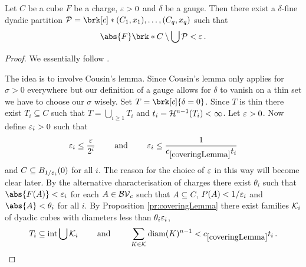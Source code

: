 \begin{lemma}\label{le:DisjointCube}
Let $C$ be a cube $F$ be a charge, $\varepsilon>0$ and $\delta$ be a gauge. Then there exist a $\delta$-fine dyadic partition $\cP=\brk[c]*{(C_1,x_1),\dots,(C_q,x_q)}$ such that
\begin{align*}
	\abs{F}\brk*{C\setminus\bigcup\cP}<\e\,.
\end{align*}
\end{lemma}
\begin{proof}

We essentially follow \cite[Lemma 2.6.4]{Pfe2001}.

The idea is to involve Cousin's lemma. Since Cousin's lemma only applies for $\sigma>0$ everywhere but our definition of a gauge allows for $\delta$ to vanish on a thin set we have to choose our $\sigma$ wisely.
Set $T=\brk[c]{\delta=0}$. Since $T$ is thin there exist $T_i\subseteq C$ such that $T=\bigcup_{i\geq1}T_i$ and $t_i=\mathcal{H}^{n-1}(T_i)<\infty$.
Let $\varepsilon>0$. 
Now define $\varepsilon_i>0$ such that
\begin{align*}
	\e_i\leq \frac{\e}{2^i}\qquad\text{ and }\qquad\e_i\leq \frac{1}{\useconstant{coveringLemma}t_i}
\end{align*}
and $C\subseteq B_{1/\varepsilon_i}(0)$ for all $i$. The reason for the choice of $\varepsilon$ in this way will become clear later.
By the alternative characterisation of charges there exist $\theta_i$ such that $\abs{F(A)}<\e_i$ for each $A\in\mathcal{BV}_c$ such that $A\subseteq C$, $P(A)<1/\varepsilon_i$ and $\abs{A}<\theta_i$ for all $i$.
By Proposition \ref{pr:coveringLemma} there exist families $\mathcal{K}_i$ of dyadic cubes with diameters less than $\theta_i\varepsilon_i$, 
\begin{align*}
	T_i\subseteq \interiour\bigcup\cK_i
	\qquad\text{ and }\qquad
	\sum_{K\in\cK}\diam(K)^{n-1}<\useconstant{coveringLemma} t_i\,.
\end{align*}


\end{proof}
